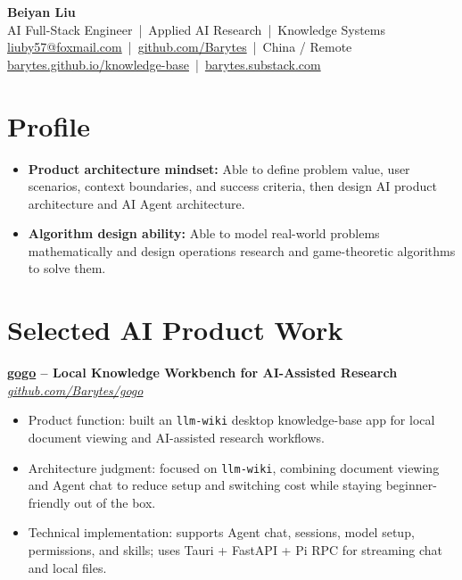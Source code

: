 \documentclass[10pt,letterpaper]{article}
\newcommand{\resumeItem}[1]{\item #1}
\newcommand{\projectHeading}[2]{
  \textbf{#1} \hfill \textit{#2}
}
\begin{document}
\small

\begin{center}
  {\LARGE \textbf{Beiyan Liu}} \\
  \vspace{2pt}
  AI Full-Stack Engineer \,|\, Applied AI Research \,|\, Knowledge Systems \\
  \vspace{2pt}
  \href{mailto:liuby57@foxmail.com}{liuby57@foxmail.com} \,|\,
  \href{https://github.com/Barytes}{github.com/Barytes} \,|\, China / Remote \\
  \href{https://barytes.github.io/knowledge-base}{barytes.github.io/knowledge-base} \,|\,
  \href{https://barytes.substack.com}{barytes.substack.com}
\end{center}

\section{Profile}
\begin{itemize}
  \resumeItem{\textbf{Product architecture mindset:} Able to define problem value, user scenarios, context boundaries, and success criteria, then design AI product architecture and AI Agent architecture.}
  \resumeItem{\textbf{Algorithm design ability:} Able to model real-world problems mathematically and design operations research and game-theoretic algorithms to solve them.}
\end{itemize}

\section{Selected AI Product Work}

\projectHeading{\href{https://github.com/Barytes/gogo}{gogo} -- Local Knowledge Workbench for AI-Assisted Research}{\href{https://github.com/Barytes/gogo}{github.com/Barytes/gogo}}
\begin{itemize}
  \resumeItem{Product function: built an \texttt{llm-wiki} desktop knowledge-base app for local document viewing and AI-assisted research workflows.}
  \resumeItem{Architecture judgment: focused on \texttt{llm-wiki}, combining document viewing and Agent chat to reduce setup and switching cost while staying beginner-friendly out of the box.}
  \resumeItem{Technical implementation: supports Agent chat, sessions, model setup, permissions, and skills; uses Tauri + FastAPI + Pi RPC for streaming chat and local files.}
\end{itemize}
\end{document}
